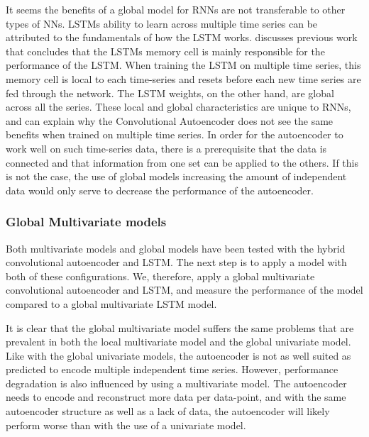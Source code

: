 It seems the benefits of a global model for RNNs are not transferable to other types
of NNs. LSTMs ability to learn across multiple time series can be attributed to the fundamentals
of how the LSTM works. \cite{Zhao2019} discusses previous work that concludes that
the LSTMs memory cell is mainly responsible for the performance of the LSTM.
When training the LSTM on multiple time series, this memory cell is local to each
time-series and resets before each new time series are fed through the network.
The LSTM weights, on the other hand, are global across all the series.
These local and global characteristics are unique to RNNs, and can explain
why the Convolutional Autoencoder does not see the same benefits when trained on multiple
time series.
In order for the autoencoder to work well on such time-series data,
there is a prerequisite that the data is connected and that information from one set can be applied to the others.
If this is not the case, the use of global models increasing the amount of independent data would only serve to decrease the performance of the autoencoder.







\subsubsection{Global Multivariate models}


Both multivariate models and global models have been tested with the hybrid convolutional autoencoder and LSTM.
The next step is to apply a model with both of these configurations.
We, therefore, apply a global multivariate convolutional autoencoder and LSTM, and measure the performance of the model
compared to a global multivariate LSTM model.

It is clear that the global multivariate model suffers the same problems that are prevalent in both the local multivariate model
and the global univariate model.
Like with the global univariate models, the autoencoder is not as well suited as predicted to encode multiple independent time series.
However, performance degradation is also influenced by using a multivariate model.
The autoencoder needs to encode and reconstruct more data per data-point, and with the same autoencoder structure
as well as a lack of data, the autoencoder will likely perform worse than with the use of a univariate model.

